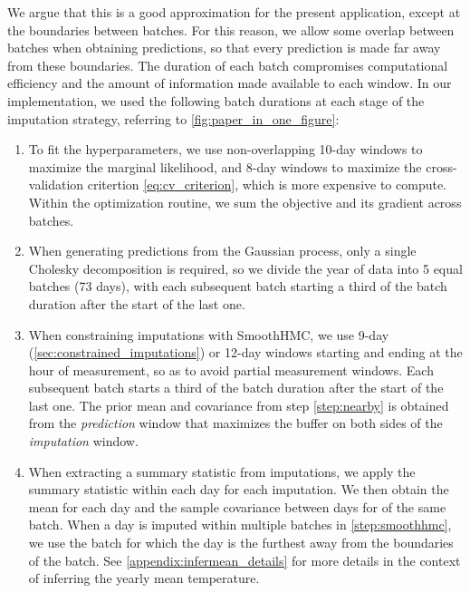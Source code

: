 We argue that this is a good approximation for the present application, except at the boundaries
between batches.
For this reason, we allow some overlap between batches when obtaining predictions,
so that every prediction is made far away from these boundaries.
The duration of each batch compromises computational efficiency and the amount of information made
available to each window.
In our implementation, we used the following batch durations at each stage of the imputation strategy, referring to \autoref{fig:paper_in_one_figure}:
\begin{enumerate}[label=(\alph*),start=2]
    \item To fit the hyperparameters, we use non-overlapping 10-day windows to maximize the marginal likelihood,
          and 8-day windows to maximize the cross-validation critertion \autoref{eq:cv_criterion}, which
          is more expensive to compute.
          Within the optimization routine, we sum the objective and its gradient across batches.
          \label{step:hyperparameters}
    \item When generating predictions from the Gaussian process, only a single Cholesky decomposition
          is required, so we divide the year of data into 5 equal batches (73 days), with each
          subsequent batch starting a third of the batch duration after the start of the last one.
          \label{step:nearby}
    \item When constraining imputations with SmoothHMC, we use 9-day (\autoref{sec:constrained_imputations}) or 12-day windows starting and ending
          at the hour of measurement, so as to avoid partial measurement windows.
          Each subsequent batch starts a third of the batch duration after the start of the last one.
          The prior mean and covariance from step \ref{step:nearby} is 
          obtained from the \emph{prediction} window that maximizes the buffer on both sides
          of the \emph{imputation} window.
          \label{step:smoothhmc}
    \setcounter{enumi}{5}
    \item When extracting a summary statistic from imputations, we apply the summary
          statistic within each day for each imputation.
          We then obtain the mean for each day and the sample covariance between days
          for of the same batch.
          When a day is imputed within multiple batches in \ref{step:smoothhmc}, we use the
          batch for which the day is the furthest away from the boundaries of the batch.
          See \autoref{appendix:infermean_details} for more details in the context of inferring the 
          yearly mean temperature.
\end{enumerate}

